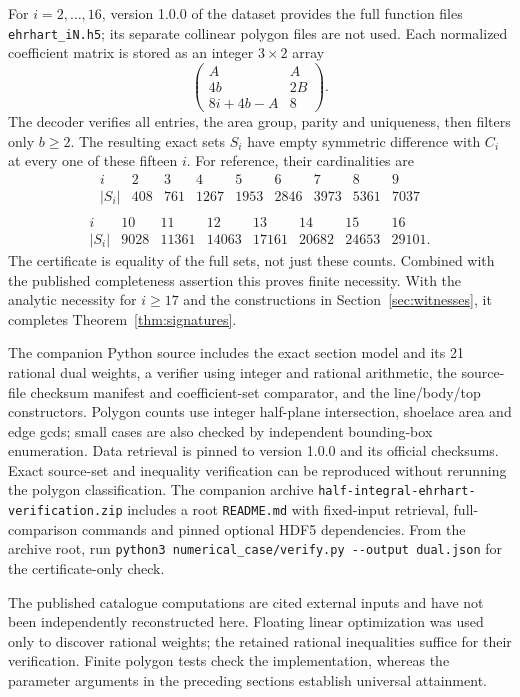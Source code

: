 \documentclass[11pt]{article}
\begin{document}
For \(i=2,\ldots,16\), version 1.0.0 of the dataset provides the full function
files \texttt{ehrhart\_iN.h5}; its separate collinear polygon files are not
used. Each normalized coefficient matrix is stored as an integer
\(3\times2\) array
\[
 \begin{pmatrix}A&A\\4b&2B\\8i+4b-A&8\end{pmatrix}.
\]
The decoder verifies all entries, the area group, parity and uniqueness,
then filters only \(b\ge2\). The resulting exact sets \(S_i\) have empty
symmetric difference with \(C_i\) at every one of these fifteen \(i\).
For reference, their cardinalities are
\[
\begin{array}{c|rrrrrrrr}
i&2&3&4&5&6&7&8&9\\ \hline
|S_i|&408&761&1267&1953&2846&3973&5361&7037\\
\end{array}
\]
\[
\begin{array}{c|rrrrrrr}
i&10&11&12&13&14&15&16\\ \hline
|S_i|&9028&11361&14063&17161&20682&24653&29101 .
\end{array}
\]
The certificate is equality of the full sets, not just these counts.
Combined with the published completeness assertion this proves finite
necessity. With the analytic necessity for \(i\ge17\) and the constructions
in Section~\ref{sec:witnesses}, it completes Theorem~\ref{thm:signatures}.

The companion Python source includes the exact section model and its 21
rational dual weights, a verifier using integer and rational arithmetic,
the source-file checksum manifest and coefficient-set comparator, and the
line/body/top constructors. Polygon counts use integer half-plane
intersection, shoelace area and edge gcds; small cases are also checked by
independent bounding-box enumeration. Data retrieval is pinned to version 1.0.0
and its official checksums. Exact source-set and inequality verification can
be reproduced without rerunning the polygon classification.
The companion archive \texttt{half-integral-ehrhart-verification.zip}
includes a root \texttt{README.md} with fixed-input retrieval,
full-comparison commands and pinned optional HDF5 dependencies.
From the archive root, run
\verb|python3 numerical_case/verify.py --output dual.json|
for the certificate-only check.

The published catalogue computations are cited external inputs and have not
been independently reconstructed here. Floating linear optimization was used
only to discover rational weights; the retained rational inequalities suffice
for their verification. Finite polygon tests check the implementation, whereas
the parameter arguments in the preceding sections establish universal
attainment.
\end{document}
